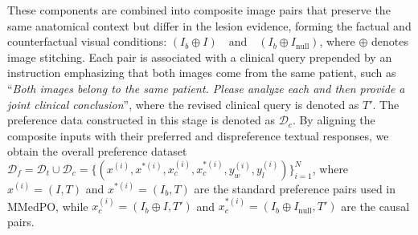 These components are combined into composite image pairs that preserve the same anatomical context but differ in the lesion evidence, forming the factual and counterfactual visual conditions: $(I_b \oplus I) \quad \text{and} \quad (I_b \oplus I_{\text{null}})$, where $\oplus$ denotes image stitching. Each pair is associated with a clinical query prepended by an instruction emphasizing that both images come from the same patient, such as “\textit{Both images belong to the same patient. Please analyze each and then provide a joint clinical conclusion}”, where the revised clinical query is denoted as $T'$. The preference data constructed in this stage is denoted as $\mathcal{D}_c$. By aligning the composite inputs with their preferred and dispreference textual responses, we obtain the overall preference dataset $\mathcal{D}_f = \mathcal{D}_t \cup \mathcal{D}_c = 
\big\{(x^{(i)},x^{*(i)},x_c^{(i)},x_c^{*(i)},y_w^{(i)},y_l^{(i)})\big\}_{i=1}^N$,
where $x^{(i)}=(I,T)$ and $x^{*(i)}=(I_b,T)$ are the standard preference pairs used in MMedPO, while $x_c^{(i)}=(I_b\!\oplus\!I,T')$ and $x_c^{*(i)}=(I_b\!\oplus\!I_{\text{null}},T')$ are the causal pairs.

